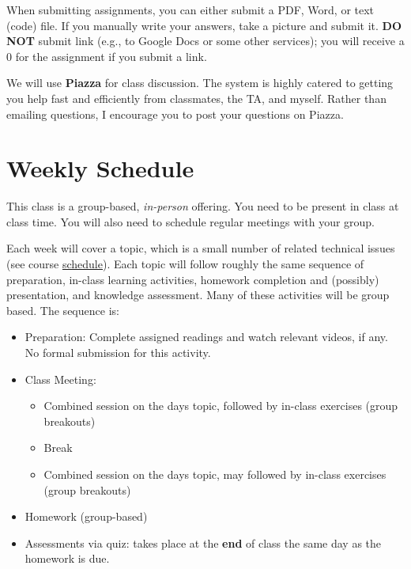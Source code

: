 \documentclass[11pt]{article}
\begin{document}
When submitting assignments, you can either submit a PDF, Word, or text (code) file.  If you manually write your answers, take a picture and submit it.  \textbf{DO NOT} submit link (e.g., to Google Docs or some other services); you will receive a 0 for the assignment if you submit a link.

We will use \textbf{Piazza} for class discussion. The system is highly catered to getting you help fast and efficiently from classmates, the TA, and myself. Rather than emailing questions, I encourage you to post your questions on Piazza. 

\section{Weekly Schedule}

This class is a group-based, \emph{in-person} offering. You need to be
present in class at class time. You will also need to schedule regular
meetings with your group.

Each week will cover a topic, which is a small number of related
technical issues (see course \href{https://nguyenthanhvuh.github.io/class-oo/assignments}{schedule}). Each
topic will follow roughly the same sequence of preparation, in-class
learning activities, homework completion and (possibly) presentation,
and knowledge assessment. Many of these activities will be group based.
The sequence is:

\begin{itemize}
\item
  Preparation: Complete assigned readings and watch relevant videos, if
  any. No formal submission for this activity.
\item
  Class Meeting:

  \begin{itemize}
  \item
    Combined session on the day\textquotesingle s topic, followed by
    in-class exercises (group breakouts)
  \item
    Break
  \item
    Combined session on the day\textquotesingle s topic, may followed by
    in-class exercises (group breakouts)
  \end{itemize}
\item
  Homework (group-based)
\item
  Assessments via quiz: takes place at the \textbf{end} of class the
  same day as the homework is due.
\end{itemize}
\end{document}
